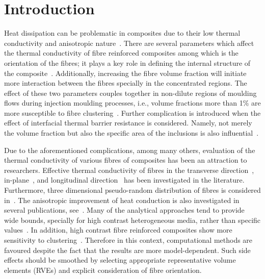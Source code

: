 \section{Introduction}
	Heat dissipation can be problematic in composites due to their low thermal conductivity and anisotropic nature~\autocite{Kalaprasad.2000}. There are several parameters which affect the thermal conductivity of fibre reinforced composites among which is the orientation of the fibres; it plays a key role in defining the internal structure of the composite~\autocite{Behzad.2007,Lee.2003}. Additionally, increasing the fibre volume fraction will initiate more interaction between the fibres specially in the concentrated regions. The effect of these two parameters couples together in non-dilute regions of moulding flows during injection moulding processes, i.e., volume fractions more than 1\% are more susceptible to fibre clustering~\autocite{Ranganathan.1990}. Further complication is introduced when the effect of interfacial thermal barrier resistance is considered. Namely, not merely the volume fraction but also the specific area of the inclusions is also influential~\autocite{Hasselman.1987}.
	
	Due to the aforementioned complications, among many others, evaluation of the thermal conductivity of various fibres of composites has been an attraction to researchers. Effective thermal conductivity of fibres in the transverse direction~\autocite{Liu.2012,Agrawal.2015,Qian.2016,Javanbakht.2018}, in-plane~\autocite{Villiere.2013,Behzad.2007}, and longitudinal direction~\autocite{Korab.2002,Yang.2005} has been investigated in the literature. Furthermore, three dimensional pseudo-random distribution of fibres is considered in~\autocite{Wang.2009,GomezMunoz.2008,Javanbakht.2016,Javanbakht.2016b,Kari.2007}. The anisotropic improvement of heat conduction is also investigated in several publications, see~\autocite{Tian.2012,Gori.2013}. Many of the analytical approaches tend to provide wide bounds, specially for high contrast heterogeneous media, rather than specific values~\autocite{Kanit.2003}. In addition, high contrast fibre reinforced composites show more sensitivity to clustering~\autocite{Kataoka.2000}. Therefore in this context, computational methods are favoured despite the fact that the results are more model-dependent. Such side effects should be smoothed by selecting appropriate representative volume elements (RVEs) and explicit consideration of fibre orientation.
	
